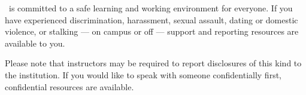 \GetInstitution\ is committed to a safe learning and working environment for
everyone. If you have experienced discrimination, harassment, sexual assault,
dating or domestic violence, or stalking --- on campus or off --- support and
reporting resources are available to you.

Please note that instructors may be required to report disclosures of this kind
to the institution. If you would like to speak with someone confidentially
first, confidential resources are available.
